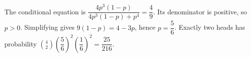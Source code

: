 The conditional equation is $\dfrac{4p^3(1-p)}{4p^3(1-p)+p^4}=\dfrac{4}{9}$. Its denominator is positive, so $p>0$. Simplifying gives $9(1-p)=4-3p$, hence $p=\dfrac{5}{6}$. Exactly two heads has probability $\binom42(\dfrac{5}{6})^2(\dfrac{1}{6})^2=\boxed{\dfrac{25}{216}}$.
